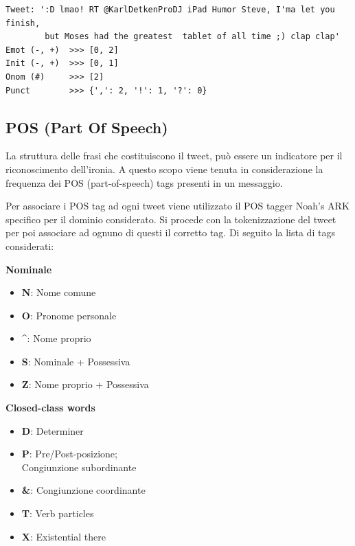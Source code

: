 \documentclass[oneside]{book}
\begin{document}
\begin{lstlisting}[caption={Esempio di tweet processato per estrarre le particelle pragmatiche.}]
Tweet: ':D lmao! RT @KarlDetkenProDJ iPad Humor Steve, I'ma let you finish,
        but Moses had the greatest  tablet of all time ;) clap clap'
Emot (-, +)  >>> [0, 2]
Init (-, +)  >>> [0, 1]
Onom (#)     >>> [2]
Punct        >>> {',': 2, '!': 1, '?': 0}
\end{lstlisting}


\subsection{POS (Part Of Speech)}
La struttura delle frasi che costituiscono il tweet, può essere un indicatore per il riconoscimento dell'ironia. A questo scopo viene tenuta in considerazione la frequenza dei POS (part-of-speech) tags presenti in un messaggio.

Per associare i POS tag ad ogni tweet viene utilizzato il POS tagger Noah's ARK \cite{ark} specifico per il dominio considerato. Si procede con la tokenizzazione del tweet per poi associare ad ognuno di questi il corretto tag. Di seguito la lista di tags considerati:\\


\begin{varwidth}[t]{\textwidth}
	\textbf{Nominale}
	\begin{itemize}
		\item \textbf{N}: Nome comune
		\item \textbf{O}: Pronome personale
		\item \textbf{\^}: Nome proprio
		\item \textbf{S}: Nominale + Possessiva
		\item \textbf{Z}: Nome proprio + Possessiva
	\end{itemize}
\end{varwidth}
\hspace{4em}
\begin{varwidth}[t]{\textwidth}
	\textbf{Closed-class words}
	\begin{itemize}
		\item \textbf{D}: Determiner
		\item \textbf{P}: Pre/Post-posizione;\\Congiunzione subordinante
		\item \textbf{\&}: Congiunzione coordinante
		\item \textbf{T}: Verb particles
		\item \textbf{X}: Existential there
	\end{itemize}
\end{varwidth}\\\\
\end{document}
